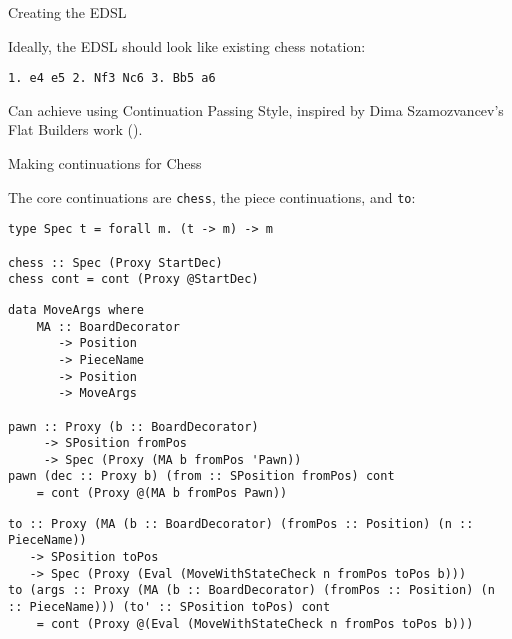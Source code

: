\documentclass{beamer}
\newcommand{\inline}[1]{\lstinline[basicstyle=\ttfamily]{#1}}
\begin{document}
\begin{frame}[fragile]{Creating the EDSL}

Ideally, the EDSL should look like existing chess notation:

\begin{verbatim}
1. e4 e5 2. Nf3 Nc6 3. Bb5 a6
\end{verbatim}

\pause

Can achieve using Continuation Passing Style, inspired by Dima Szamozvancev's Flat Builders work (\cite{mezzo}).

\end{frame}

\begin{frame}[fragile]{Making continuations for Chess}

The core continuations are \inline{chess}, the piece continuations, and \inline{to}:

\pause

\begin{overprint}

\begin{lstlisting}
type Spec t = forall m. (t -> m) -> m

chess :: Spec (Proxy StartDec)
chess cont = cont (Proxy @StartDec)
\end{lstlisting}

\begin{lstlisting}
data MoveArgs where
    MA :: BoardDecorator
       -> Position
       -> PieceName
       -> Position
       -> MoveArgs

pawn :: Proxy (b :: BoardDecorator)
     -> SPosition fromPos
     -> Spec (Proxy (MA b fromPos 'Pawn))
pawn (dec :: Proxy b) (from :: SPosition fromPos) cont
    = cont (Proxy @(MA b fromPos Pawn))
\end{lstlisting}

\begin{lstlisting}
to :: Proxy (MA (b :: BoardDecorator) (fromPos :: Position) (n :: PieceName))
   -> SPosition toPos
   -> Spec (Proxy (Eval (MoveWithStateCheck n fromPos toPos b)))
to (args :: Proxy (MA (b :: BoardDecorator) (fromPos :: Position) (n :: PieceName))) (to' :: SPosition toPos) cont
    = cont (Proxy @(Eval (MoveWithStateCheck n fromPos toPos b)))
\end{lstlisting}

\end{overprint}
    
\end{frame}
\end{document}
